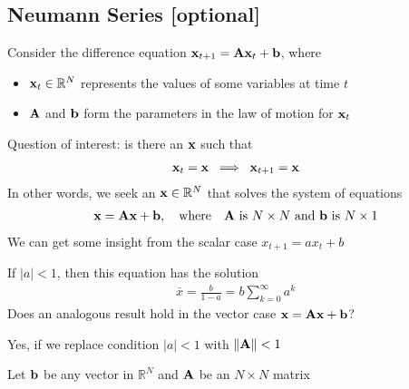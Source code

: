 \documentclass[letterpaper,10pt,english]{jupyterBook}
\begin{document}
\subsection{Neumann Series {[}optional{]}}
\label{\detokenize{05.linear_algebra:neumann-series-optional}}
\sphinxAtStartPar
Consider the difference equation \({\bf x}_{t+1} = {\bf A} {\bf x}_t + {\bf b}\), where
\begin{itemize}
\item {} 
\sphinxAtStartPar
\({\bf x}_t \in \mathbb{R}^N\) represents the values of some variables at time \(t\)

\item {} 
\sphinxAtStartPar
\({\bf A}\) and \({\bf b}\) form the parameters in the law of motion for \({\bf x}_t\)

\end{itemize}

\sphinxAtStartPar
Question of interest: is there an \({\bf x}\) such that
\begin{equation*}
\begin{split}
%
{\bf x}_t = {\bf x} \; \implies \; {\bf x}_{t+1} = {\bf x}
%
\end{split}
\end{equation*}
\sphinxAtStartPar
In other words, we seek an \({\bf x} \in \mathbb{R}^N\) that solves the system of equations
\begin{equation*}
\begin{split}
%
{\bf x} = {\bf A} {\bf x} + {\bf b}, 
\quad \text{where} \quad {\bf A} \text{ is } N \times N
\text{ and } {\bf b} \text{ is } N \times 1
%
\end{split}
\end{equation*}
\sphinxAtStartPar
We can get some insight from the scalar case \(x_{t+1} = a x_t + b\)

\sphinxAtStartPar
If \(|a| < 1\), then this equation has the solution
\begin{equation*}
\begin{split}
%
\bar x 
= \frac{b}{1-a} 
= b \sum_{k=0}^{\infty} a^k 
%
\end{split}
\end{equation*}
\sphinxAtStartPar
Does an analogous result hold in the vector case \({\bf x} = {\bf A} {\bf x} + {\bf b}\)?

\sphinxAtStartPar
Yes, if we replace condition \(|a| < 1\) with \(\| {\bf A} \| < 1\)

\sphinxAtStartPar
Let \({\bf b}\) be any vector in \(\mathbb{R}^N\) and \({\bf A}\) be an \(N \times N\) matrix
\end{document}
